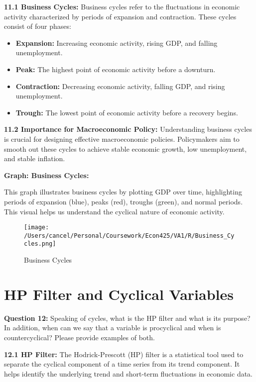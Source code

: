 \documentclass{article}
\begin{document}
\textbf{11.1 Business Cycles:} Business cycles refer to the fluctuations in economic activity characterized by periods of expansion and contraction. These cycles consist of four phases:

\begin{itemize}
    \item \textbf{Expansion:} Increasing economic activity, rising GDP, and falling unemployment.
    \item \textbf{Peak:} The highest point of economic activity before a downturn.
    \item \textbf{Contraction:} Decreasing economic activity, falling GDP, and rising unemployment.
    \item \textbf{Trough:} The lowest point of economic activity before a recovery begins.
\end{itemize}

\textbf{11.2 Importance for Macroeconomic Policy:} Understanding business cycles is crucial for designing effective macroeconomic policies. Policymakers aim to smooth out these cycles to achieve stable economic growth, low unemployment, and stable inflation.

\textbf{Graph: Business Cycles:} 

This graph illustrates business cycles by plotting GDP over time, highlighting periods of expansion (blue), peaks (red), troughs (green), and normal periods. This visual helps us understand the cyclical nature of economic activity.

\begin{figure}[h!]
    \centering
    \texttt{[image: /Users/cancel/Personal/Coursework/Econ425/VA1/R/Business\_Cycles.png]}
    \caption{Business Cycles}
\end{figure}

\hrulefill

\section{HP Filter and Cyclical Variables}

\textbf{Question 12:} Speaking of cycles, what is the HP filter and what is its purpose? In addition, when can we say that a variable is procyclical and when is countercyclical? Please provide examples of both.

\textbf{12.1 HP Filter:} The Hodrick-Prescott (HP) filter is a statistical tool used to separate the cyclical component of a time series from its trend component. It helps identify the underlying trend and short-term fluctuations in economic data.
\end{document}
